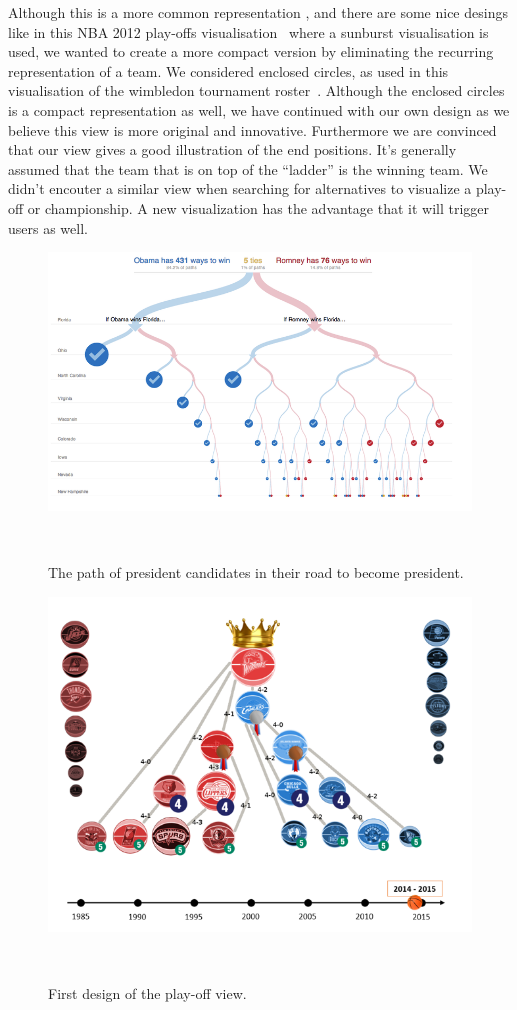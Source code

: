 \documentclass{sigchi}
\begin{document}
Although this is a more common representation , and there are some nice desings like in this NBA 2012 play-offs visualisation~\cite{tournamentladder} where a sunburst visualisation is used, we wanted to create a more compact version by eliminating the recurring representation of a team. We considered enclosed circles, as used in this visualisation of the wimbledon tournament roster~\cite{enclosedcircles}.
Although the enclosed circles is a compact representation as well, we have continued 
with our own design as we believe this view is more original and innovative. Furthermore we are convinced that our view gives a good illustration of the end positions. It's generally assumed that the team that is on top of the ``ladder'' is the winning team. We didn't encouter a similar view when searching for alternatives to visualize a play-off or championship. A new visualization has the advantage that it will trigger users as well.


\begin{figure}
\centering
  \includegraphics[width=0.9\columnwidth]{figures/presidentcandidatesvisualization}
  \caption{The path of president candidates in their road to become president.}~\label{fig:whitehousepath}
\end{figure}

\begin{figure}
\centering
  \includegraphics[width=0.9\columnwidth]{figures/playoffviewfirstdesign}
  \caption{First design of the play-off view.}~\label{fig:firstdesignplayoffview}
\end{figure}
\end{document}
